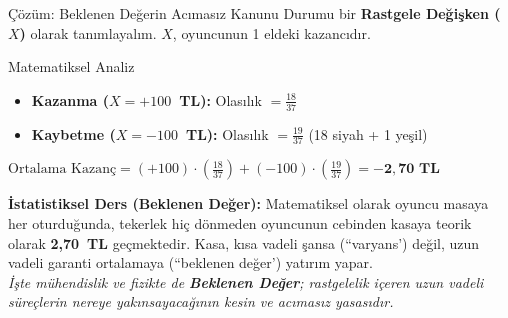 ﻿\documentclass[light]{lutbeamer}
\begin{document}
\begin{frame}{Çözüm: Beklenen Değerin Acımasız Kanunu}
    \justifying{}
    Durumu bir \textbf{Rastgele Değişken ($X$)} olarak tanımlayalım. $X$, oyuncunun 1 eldeki kazancıdır.

    \vspace{0.5em}
    \begin{block}{Matematiksel Analiz}
        \begin{itemize}
            \item \textbf{Kazanma ($X = +100$~TL):} Olasılık $= \frac{18}{37}$
            \item \textbf{Kaybetme ($X = -100$~TL):} Olasılık $= \frac{19}{37}$ (18 siyah + 1 yeşil)
        \end{itemize}
        
        \vspace{0.5em}
        $\text{Ortalama Kazanç} = (+100) \cdot \left(\frac{18}{37}\right) + (-100) \cdot \left(\frac{19}{37}\right) = \mathbf{-2{,}70 \text{ TL}}$
    \end{block}

    \vspace{0.5em}
    \textbf{İstatistiksel Ders (Beklenen Değer):} Matematiksel olarak oyuncu masaya her oturduğunda, tekerlek hiç dönmeden oyuncunun cebinden kasaya teorik olarak \textbf{2,70~TL} geçmektedir. Kasa, kısa vadeli şansa (``varyans') değil, uzun vadeli garanti ortalamaya (``beklenen değer') yatırım yapar.
    \\ \vspace{0.5em} \centering
    \textit{İşte mühendislik ve fizikte de \textbf{Beklenen Değer}; rastgelelik içeren uzun vadeli süreçlerin nereye yakınsayacağının kesin ve acımasız yasasıdır.}
\end{frame}
\end{document}
